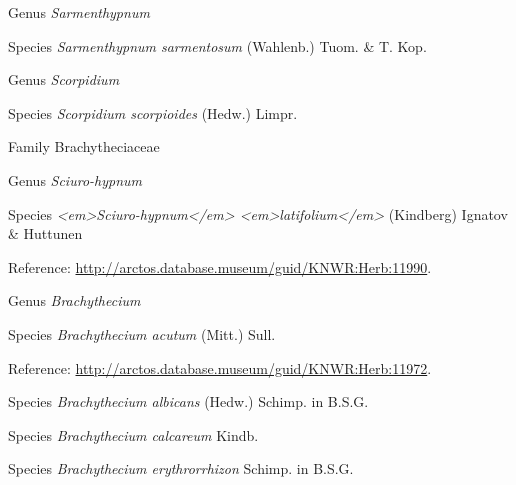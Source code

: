 \documentclass[9pt, article]{memoir}
\begin{document}
\begin{multicols}{2}
\vspace{6pt}\noindent\hspace{30pt}Genus \textit{Sarmenthypnum}


\vspace{6pt}\noindent\hspace{36pt}Species \textit{Sarmenthypnum sarmentosum} (Wahlenb.) Tuom. \& T. Kop.


\vspace{6pt}\noindent\hspace{30pt}Genus \textit{Scorpidium}


\vspace{6pt}\noindent\hspace{36pt}Species \textit{Scorpidium scorpioides} (Hedw.) Limpr.


\vspace{6pt}\noindent\hspace{24pt}Family Brachytheciaceae


\vspace{6pt}\noindent\hspace{30pt}Genus \textit{Sciuro-hypnum}


\vspace{6pt}\noindent\hspace{36pt}Species \textit{<em>Sciuro-hypnum</em> <em>latifolium</em>} (Kindberg) Ignatov \& Huttunen


\vspace{6pt}Reference: 
\url{http://arctos.database.museum/guid/KNWR:Herb:11990}.

\vspace{6pt}\noindent\hspace{30pt}Genus \textit{Brachythecium}


\vspace{6pt}\noindent\hspace{36pt}Species \textit{Brachythecium acutum} (Mitt.) Sull.


\vspace{6pt}Reference: 
\url{http://arctos.database.museum/guid/KNWR:Herb:11972}.

\vspace{6pt}\noindent\hspace{36pt}Species \textit{Brachythecium albicans} (Hedw.) Schimp. in B.S.G.


\vspace{6pt}\noindent\hspace{36pt}Species \textit{Brachythecium calcareum} Kindb.


\vspace{6pt}\noindent\hspace{36pt}Species \textit{Brachythecium erythrorrhizon} Schimp. in B.S.G.



\end{multicols}
\end{document}
